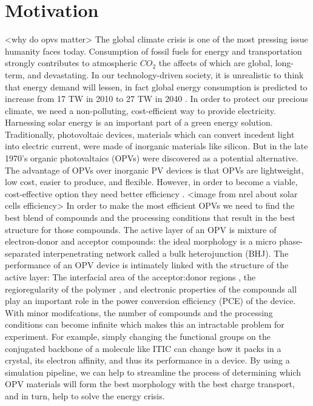 \section*{Motivation}

<why do opvs matter>
The global climate crisis is one of the most pressing issue humanity faces today.
Consumption of fossil fuels for energy and transportation strongly contributes to atmospheric $CO_2$ the affects of which are global, long-term, and devastating\cite{Solomon2009a}.
In our technology-driven society, it is unrealistic to think that energy demand will lessen, in fact global energy consumption is predicted to increase from 17 TW in 2010 to 27 TW in 2040 \cite{Mazzio2015}.
In order to protect our precious climate, we need a non-polluting, cost-efficient way to provide electricity.
Harnessing solar energy is an important part of a green energy solution.
Traditionally, photovoltaic devices, materials which can convert incedent light into electric current, were made of inorganic materials like silicon.
But in the late 1970's organic photovaltaics (OPVs) were discovered as a potential alternative.
The advantage of OPVs over inorganic PV devices is that OPVs are lightweight, low cost, easier to produce, and flexible. 
However, in order to become a viable, cost-effective option they need better efficiency \cite{Mazzio2015}.
<image from nrel about solar cells efficiency>\cite{https://www.nrel.gov/pv/cell-efficiency.html}
In order to make the most efficient OPVs we need to find the best blend of compounds and the processing conditions that result in the best structure for those compounds.
The active layer of an OPV is mixture of electron-donor and acceptor compounds: the ideal morphology is a micro phase-separated interpenetrating network called a bulk heterojunction (BHJ).
The performance of an OPV device is intimately linked with the structure of the active layer:
The interfacial area of the acceptor:donor regions \cite{Mazzio2015}, the regioregularity of the polymer \cite{Kim2006}, and electronic properties of the compounds \cite{Scharber2006a} all play an important role in the power conversion efficiency (PCE) of the device.
With minor modifcations, the number of compounds and the processing conditions can become infinite which makes this an intractable problem for experiment.
For example, simply changing the functional groups on the conjugated backbone of a molecule like ITIC can change how it packs in a crystal, its electron affinity, and thus its performance in a device\cite{Swick2019a}.
By using a simulation pipeline, we can help to streamline the process of determining which OPV materials will form the best morphology with the best charge transport, and in turn, help to solve the energy crisis.
